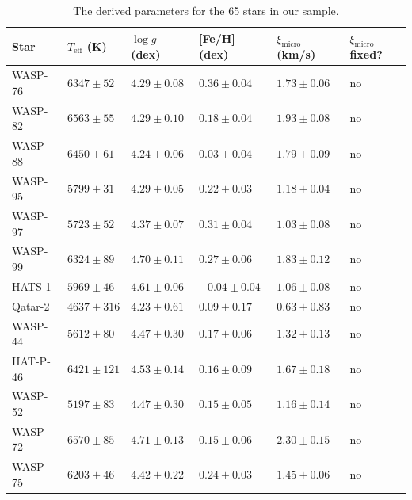 \documentclass{aa}
\begin{document}
\begin{table}[htb!]
    \caption{The derived parameters for the 65 stars in our sample.}
    \label{tab:results}
    \centering
    \begin{tabular}{llllll}
      \hline\hline
        Star      & $T_\mathrm{eff}$ (K) &  $\log g$ (dex)     &  [Fe/H] (dex)        &  $\xi_\mathrm{micro}$ (km/s) & $\xi_\mathrm{micro}$ fixed? \\
      \hline
      WASP-76     &  $6347 \pm  52$      &  $4.29 \pm 0.08$    &  $ 0.36 \pm 0.04$    &  $1.73 \pm 0.06$             &  no \\
      WASP-82     &  $6563 \pm  55$      &  $4.29 \pm 0.10$    &  $ 0.18 \pm 0.04$    &  $1.93 \pm 0.08$             &  no \\
      WASP-88     &  $6450 \pm  61$      &  $4.24 \pm 0.06$    &  $ 0.03 \pm 0.04$    &  $1.79 \pm 0.09$             &  no \\
      WASP-95     &  $5799 \pm  31$      &  $4.29 \pm 0.05$    &  $ 0.22 \pm 0.03$    &  $1.18 \pm 0.04$             &  no \\
      WASP-97     &  $5723 \pm  52$      &  $4.37 \pm 0.07$    &  $ 0.31 \pm 0.04$    &  $1.03 \pm 0.08$             &  no \\
      WASP-99     &  $6324 \pm  89$      &  $4.70 \pm 0.11$    &  $ 0.27 \pm 0.06$    &  $1.83 \pm 0.12$             &  no \\
       HATS-1     &  $5969 \pm  46$      &  $4.61 \pm 0.06$    &  $-0.04 \pm 0.04$    &  $1.06 \pm 0.08$             &  no \\
      Qatar-2     &  $4637 \pm 316$      &  $4.23 \pm 0.61$    &  $ 0.09 \pm 0.17$    &  $0.63 \pm 0.83$             &  no \\
      WASP-44     &  $5612 \pm  80$      &  $4.47 \pm 0.30$    &  $ 0.17 \pm 0.06$    &  $1.32 \pm 0.13$             &  no \\
     HAT-P-46     &  $6421 \pm 121$      &  $4.53 \pm 0.14$    &  $ 0.16 \pm 0.09$    &  $1.67 \pm 0.18$             &  no \\
      WASP-52     &  $5197 \pm  83$      &  $4.47 \pm 0.30$    &  $ 0.15 \pm 0.05$    &  $1.16 \pm 0.14$             &  no \\
      WASP-72     &  $6570 \pm  85$      &  $4.71 \pm 0.13$    &  $ 0.15 \pm 0.06$    &  $2.30 \pm 0.15$             &  no \\
      WASP-75     &  $6203 \pm  46$      &  $4.42 \pm 0.22$    &  $ 0.24 \pm 0.03$    &  $1.45 \pm 0.06$             &  no \\

\end{tabular}
\end{table}
\end{document}
